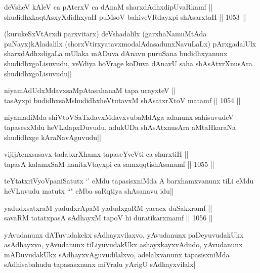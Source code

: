 
\begin{shl}
deVsheV kAleV ca pAterxV ca dAnaM sharxdAdhxdipUvaRkamf || \\
shudidhxkaqtAsxyXdidhxyaH puMsoV bahiveVRdayxpi shAsarxtaH ||  1053 ||  
\end{shl}

\begin{artha}
(kurukeSxVtArxdi parxvitarx) deVshadalilx (garxhaNamuMtAda puNayx)kAladalilx (shorxVtirxyatavxmodalAdasadunxNavuLaLx) pArxgadalUlx sharxdAdhxdigaLa mUlaka mADuva dAnavu puruSana budidhxyanunx shudidhxgoLisuvudu, veVdiya hoVrage koDuva dAnavU saha shAsAtxrXnusAra shudidhxgoLisuvudu||
\end{artha}


\begin{shl}
niyamAdUdxMdavxsaMpAtasahanaM tapa ucayxteV || \\
tasAyxpi budidhxsaMshudidhxheVtutavxM shAsatxrXtoV matamf ||  1054 ||  
\end{shl}

\begin{artha}
niyamadiMda shiVtoVSaTxdavxMdavxvubaMdAga adanunx sahisuvudeV tapasesxMdu heVLalapxDuvudu, adukUDa shAsAtxnusAra aMtaHkaraNa shudidhxge kAraNavAguvudu||
\end{artha}

\begin{shl}
vijijAcnxsasavx tadabxrXhamx tapaseYveVti ca shurxtiH || \\
tapasA kalamxSaM hanitxVtayxpi ca samxqqtishAsanamf ||  1055 ||  
\end{shl}

\begin{artha}
teYtatxriVyoVpaniSatutx `\stext' eMdu tapasisxniMda A barxhamxvanunx tiLi eMdu heVLuvudu matutx ``\stext" eMba saRqtiya shAsanavu idu||
\end{artha}


\begin{shl}
yadudxsatxraM yadudxrApaM yadudxgaRM yacacx duSakxramf || \\
savaRM tatatxpasA sAdhayxM tapoV hi duratikarxmamf ||  1056 ||  
\end{shl}

\begin{artha}
yAvudanunx dATuvudakekx sAdhayxvilaxvo, yAvudanunx paDeyuvudakUkx asAdhayxvo, yAvudanunx tiLiyuvudakUkx ashayxkayxvAdudo, yAvudanunx mADuvudakUkx sAdhayxvAguvudilalxvo, adelalxvanunx tapasisxniMda sAdhisabahudu tapasasxnunx miVralu yArigU sAdhayxvilalx|
\end{artha}

